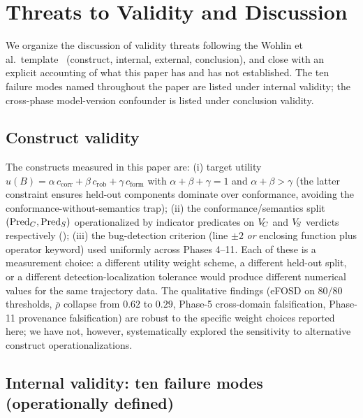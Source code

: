 \section{Threats to Validity and Discussion}
\label{sec:discussion}
\label{sec:failure-modes}

We organize the discussion of validity threats following the Wohlin et al.\ template~\cite{wohlin2012experimentation} (construct, internal, external, conclusion), and close with an explicit accounting of what this paper has and has not established. The ten failure modes named throughout the paper are listed under internal validity; the cross-phase model-version confounder is listed under conclusion validity.

\subsection{Construct validity}
\label{sec:construct-validity}

The constructs measured in this paper are: (i) target utility $u(B) = \alpha\, c_{\mathrm{corr}} + \beta\, c_{\mathrm{rob}} + \gamma\, c_{\mathrm{form}}$ with $\alpha + \beta + \gamma = 1$ and $\alpha + \beta > \gamma$ (the latter constraint ensures held-out components dominate over conformance, avoiding the conformance-without-semantics trap); (ii) the conformance/semantics split $(\mathrm{Pred}_C, \mathrm{Pred}_S)$ operationalized by indicator predicates on $V_{\!C}$ and $V_{\!S}$ verdicts respectively (); (iii) the bug-detection criterion (line $\pm 2$ \emph{or} enclosing function plus operator keyword) used uniformly across Phases 4--11. Each of these is a measurement choice: a different utility weight scheme, a different held-out split, or a different detection-localization tolerance would produce different numerical values for the same trajectory data. The qualitative findings (eFOSD on $80/80$ thresholds, $\bar{\rho}$ collapse from $0.62$ to $0.29$, Phase-5 cross-domain falsification, Phase-11 provenance falsification) are robust to the specific weight choices reported here; we have not, however, systematically explored the sensitivity to alternative construct operationalizations.

\subsection{Internal validity: ten failure modes (operationally defined)}
\label{sec:internal-validity}

